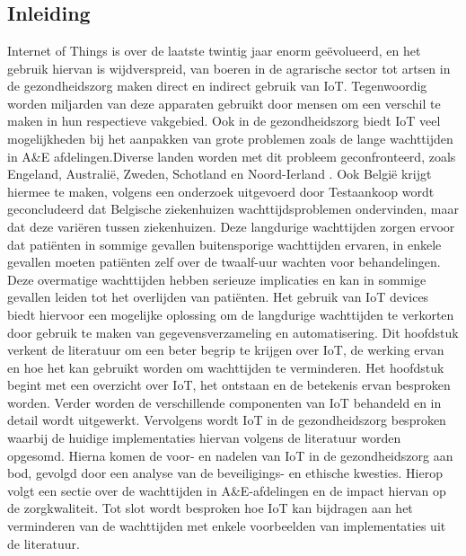 \usepackage{graphicx}
\usepackage{array}
\usepackage{longtable}
\usepackage{booktabs}
\usepackage{tabularx}
\usepackage[a4paper,margin=1in]{geometry}


\chapter{}%
\label{ch:stand-van-zaken}

\section{Inleiding}
Internet of Things is over de laatste twintig jaar enorm geëvolueerd, en het gebruik hiervan is wijdverspreid, van boeren in de agrarische sector tot artsen in de gezondheidszorg maken direct en indirect gebruik van IoT. Tegenwoordig worden miljarden van deze apparaten gebruikt door mensen om een verschil te maken in hun respectieve vakgebied. Ook in de gezondheidszorg biedt IoT veel mogelijkheden bij het aanpakken van grote problemen zoals de lange wachttijden in A\&E afdelingen.Diverse landen worden met dit probleem geconfronteerd, zoals Engeland, Australië, Zweden, Schotland en Noord-Ierland \autocite{Friebel2020}. Ook België krijgt hiermee te maken,  volgens een onderzoek uitgevoerd door \TODO Testaankoop wordt geconcludeerd dat Belgische ziekenhuizen wachttijdsproblemen ondervinden, maar dat deze variëren tussen ziekenhuizen. Deze langdurige wachttijden zorgen ervoor dat patiënten in sommige gevallen buitensporige wachttijden ervaren, in enkele gevallen moeten patiënten zelf over de twaalf-uur wachten voor behandelingen. Deze overmatige wachttijden hebben serieuze implicaties en kan in sommige gevallen leiden tot het overlijden van patiënten. Het gebruik van IoT devices biedt hiervoor een mogelijke oplossing om de langdurige wachttijden te verkorten door gebruik te maken van gegevensverzameling en automatisering. Dit hoofdstuk verkent de literatuur om een beter begrip te krijgen over IoT, de werking ervan en hoe het kan gebruikt worden om wachttijden te verminderen. Het hoofdstuk begint met een overzicht over IoT, het ontstaan en de betekenis ervan besproken worden. Verder worden de verschillende componenten van IoT behandeld en in detail wordt uitgewerkt. Vervolgens wordt IoT in de gezondheidszorg besproken waarbij de huidige implementaties hiervan volgens de literatuur worden opgesomd. Hierna komen de voor- en nadelen van IoT in de gezondheidszorg aan bod, gevolgd door een analyse van de beveiligings- en ethische kwesties. Hierop volgt een sectie over de wachttijden in A\&E-afdelingen en de impact hiervan op de zorgkwaliteit. Tot slot wordt besproken hoe IoT kan bijdragen aan het verminderen van de wachttijden met enkele voorbeelden van implementaties uit de literatuur.

